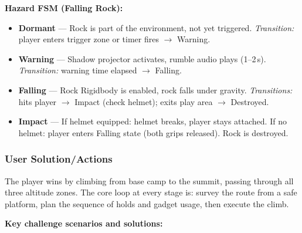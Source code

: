 \documentclass[12pt]{article}
\begin{document}
\textbf{Hazard FSM (Falling Rock):}

\begin{itemize}[leftmargin=2em]
    \item \textbf{Dormant} --- Rock is part of the environment, not yet triggered. \emph{Transition:} player enters trigger zone or timer fires $\rightarrow$ Warning.
    \item \textbf{Warning} --- Shadow projector activates, rumble audio plays (1--2\,s). \emph{Transition:} warning time elapsed $\rightarrow$ Falling.
    \item \textbf{Falling} --- Rock Rigidbody is enabled, rock falls under gravity. \emph{Transitions:} hits player $\rightarrow$ Impact (check helmet); exits play area $\rightarrow$ Destroyed.
    \item \textbf{Impact} --- If helmet equipped: helmet breaks, player stays attached. If no helmet: player enters Falling state (both grips released). Rock is destroyed.
\end{itemize}


\subsubsection{User Solution/Actions}

The player wins by climbing from base camp to the summit, passing through all three altitude zones. The core loop at every stage is: survey the route from a safe platform, plan the sequence of holds and gadget usage, then execute the climb.

\textbf{Key challenge scenarios and solutions:}
\end{document}
